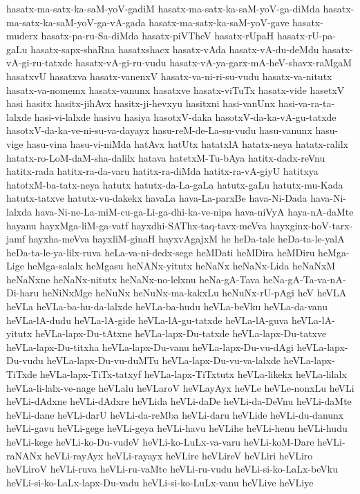 {hasatx-ma-satx-ka-saM-yoV-gadiM
hasatx-ma-satx-ka-saM-yoV-ga-diMda
hasatx-ma-satx-ka-saM-yoV-ga-vA-gada
hasatx-ma-satx-ka-saM-yoV-gave
hasatx-muderx
hasatx-pa-ru-Sa-diMda
hasatx-piVTheV
hasatx-rUpaH
hasatx-rU-pa-gaLu
hasatx-sapx-shaRna
hasatxshacx
hasatx-vAda
hasatx-vA-du-deMdu
hasatx-vA-gi-ru-tatxde
hasatx-vA-gi-ru-vudu
hasatx-vA-ya-garx-mA-heV-shavx-raMgaM
hasatxvU
hasatxva
hasatx-vanenxV
hasatx-va-ni-ri-su-vudu
hasatx-va-nitutx
hasatx-va-nomemx
hasatx-vanunx
hasatxve
hasatx-viTuTx
hasatx-vide
hasetxV
hasi
hasitx
hasitx-jihAvx
hasitx-ji-hevxyu
hasitxni
hasi-vanUnx
hasi-va-ra-ta-lalxde
hasi-vi-lalxde
hasivu
hasiya
hasotxV-daka
hasotxV-da-ka-vA-gu-tatxde
hasotxV-da-ka-ve-ni-su-va-dayayx
hasu-reM-de-La-su-vudu
hasu-vanunx
hasu-vige
hasu-vina
hasu-vi-niMda
hatAvx
hatUtx
hatatxlA
hatatx-neya
hatatx-ralilx
hatatx-ro-LoM-daM-sha-dalilx
hatava
hatetxM-Tu-bAya
hatitx-dadx-reVnu
hatitx-rada
hatitx-ra-da-varu
hatitx-ra-diMda
hatitx-ra-vA-giyU
hatitxya
hatotxM-ba-tatx-neya
hatutx
hatutx-da-La-gaLa
hatutx-gaLu
hatutx-mu-Kada
hatutx-tatxve
hatutx-vu-dakekx
havaLa
hava-La-parxBe
hava-Ni-Dada
hava-Ni-lalxda
hava-Ni-ne-La-miM-cu-ga-Li-ga-dhi-ka-ve-nipa
hava-niVyA
haya-nA-daMte
hayanu
hayxMga-liM-ga-vatf
hayxdhi-SAThx-taq-tavx-meVva
hayxginx-hoV-tarx-jamf
hayxha-meVva
hayxliM-ginaH
hayxvAgajxM
he
heDa-tale
heDa-ta-le-yalA
heDa-ta-le-ya-lilx-ruva
heLa-va-ni-dedx-sege
heMDati
heMDira
heMDiru
heMga-Lige
heMga-salalx
heMgasu
heNANx-yitutx
heNaNx
heNaNx-Lida
heNaNxM
heNaNxne
heNaNx-nitutx
heNaNx-no-lelxnu
heNa-gA-Tava
heNa-gA-Ta-va-nA-Di-haru
heNiNxMge
heNuNx
heNuNx-ma-kakxLu
heNuNx-rU-pAgi
heV
heVLA
heVLa
heVLa-ba-hu-da-lalxde
heVLa-ba-hudu
heVLa-beVku
heVLa-da-vanu
heVLa-lA-dudu
heVLa-lA-gide
heVLa-lA-gu-tatxde
heVLa-lA-guva
heVLa-lA-yitutx
heVLa-lapx-Du-tAtxne
heVLa-lapx-Du-tatxde
heVLa-lapx-Du-tatxve
heVLa-lapx-Du-titxha
heVLa-lapx-Du-vanu
heVLa-lapx-Du-vu-dAgi
heVLa-lapx-Du-vudu
heVLa-lapx-Du-vu-duMTu
heVLa-lapx-Du-vu-va-lalxde
heVLa-lapx-TiTxde
heVLa-lapx-TiTx-tatxyf
heVLa-lapx-TiTxtutx
heVLa-likekx
heVLa-lilalx
heVLa-li-lalx-ve-nage
heVLalu
heVLaroV
heVLayAyx
heVLe
heVLe-nonxLu
heVLi
heVLi-dAdxne
heVLi-dAdxre
heVLida
heVLi-daDe
heVLi-da-DeVnu
heVLi-daMte
heVLi-dane
heVLi-darU
heVLi-da-reMba
heVLi-daru
heVLide
heVLi-du-danunx
heVLi-gavu
heVLi-gege
heVLi-geya
heVLi-havu
heVLihe
heVLi-henu
heVLi-hudu
heVLi-kege
heVLi-ko-Du-vudeV
heVLi-ko-LuLx-va-varu
heVLi-koM-Dare
heVLi-raNANx
heVLi-rayAyx
heVLi-rayayx
heVLire
heVLireV
heVLiri
heVLiro
heVLiroV
heVLi-ruva
heVLi-ru-vaMte
heVLi-ru-vudu
heVLi-si-ko-LaLx-beVku
heVLi-si-ko-LaLx-lapx-Du-vadu
heVLi-si-ko-LuLx-vanu
heVLive
heVLiye
}
